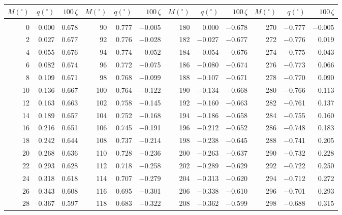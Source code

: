 \clearpage
\begin{table}[!h]\centering
\vspace{0.25cm}
\scriptsize{ \begin{tabular}{rrr|rrr|rrr|rrr}
$M(^\circ)$ & $q(^\circ)$  & $100\,\zeta$ & $M(^\circ)$ & $q(^\circ)$  & $100\,\zeta$ & $M(^\circ)$ & $q(^\circ)$  & $100\,\zeta$& $M(^\circ)$ & $q(^\circ)$  & $100\,\zeta$\\\hline
&&&&&&&&&&&\\[-1.75ex]
   0 &   0.000 &  0.678 &  90 &   0.777 & $-$0.005 & 180 &   0.000 & $-$0.678 & 270 &  $-$0.777 & $-$0.005\\
  2 &   0.027 &  0.677 &  92 &   0.776 & $-$0.028 & 182 &  $-$0.027 & $-$0.677 & 272 &  $-$0.776 &  0.019\\
  4 &   0.055 &  0.676 &  94 &   0.774 & $-$0.052 & 184 &  $-$0.054 & $-$0.676 & 274 &  $-$0.775 &  0.043\\
  6 &   0.082 &  0.674 &  96 &   0.772 & $-$0.075 & 186 &  $-$0.080 & $-$0.674 & 276 &  $-$0.773 &  0.066\\
  8 &   0.109 &  0.671 &  98 &   0.768 & $-$0.099 & 188 &  $-$0.107 & $-$0.671 & 278 &  $-$0.770 &  0.090\\
 10 &   0.136 &  0.667 & 100 &   0.764 & $-$0.122 & 190 &  $-$0.134 & $-$0.668 & 280 &  $-$0.766 &  0.113\\
 12 &   0.163 &  0.663 & 102 &   0.758 & $-$0.145 & 192 &  $-$0.160 & $-$0.663 & 282 &  $-$0.761 &  0.137\\
 14 &   0.189 &  0.657 & 104 &   0.752 & $-$0.168 & 194 &  $-$0.186 & $-$0.658 & 284 &  $-$0.755 &  0.160\\
 16 &   0.216 &  0.651 & 106 &   0.745 & $-$0.191 & 196 &  $-$0.212 & $-$0.652 & 286 &  $-$0.748 &  0.183\\
 18 &   0.242 &  0.644 & 108 &   0.737 & $-$0.214 & 198 &  $-$0.238 & $-$0.645 & 288 &  $-$0.741 &  0.205\\
 20 &   0.268 &  0.636 & 110 &   0.728 & $-$0.236 & 200 &  $-$0.263 & $-$0.637 & 290 &  $-$0.732 &  0.228\\
 22 &   0.293 &  0.628 & 112 &   0.718 & $-$0.258 & 202 &  $-$0.289 & $-$0.629 & 292 &  $-$0.722 &  0.250\\
 24 &   0.318 &  0.618 & 114 &   0.707 & $-$0.279 & 204 &  $-$0.313 & $-$0.620 & 294 &  $-$0.712 &  0.272\\
 26 &   0.343 &  0.608 & 116 &   0.695 & $-$0.301 & 206 &  $-$0.338 & $-$0.610 & 296 &  $-$0.701 &  0.293\\
 28 &   0.367 &  0.597 & 118 &   0.683 & $-$0.322 & 208 &  $-$0.362 & $-$0.599 & 298 &  $-$0.688 &  0.315\\

\end{tabular}}
\end{table}
